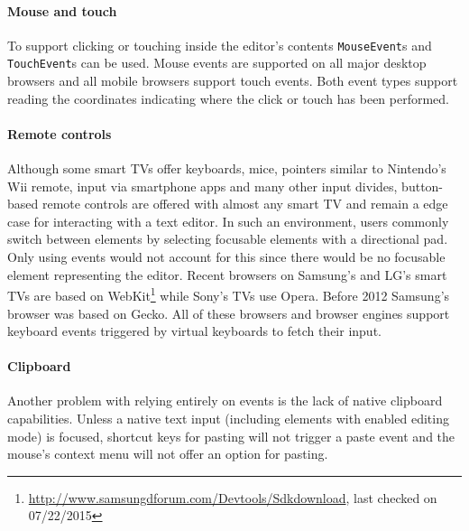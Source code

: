 \paragraph{Mouse and touch} To support clicking or touching inside the editor's contents \texttt{MouseEvent}s and \texttt{TouchEvent}s can be used. Mouse events are supported on all major desktop browsers and all mobile browsers support touch events. Both event types support reading the coordinates indicating where the click or touch has been performed.

\paragraph{Remote controls} Although some smart TVs offer keyboards, mice, pointers similar to Nintendo's Wii remote, input via smartphone apps and many other input divides, button-based remote controls are offered with almost any smart TV and remain a edge case for interacting with a text editor. In such an environment, users commonly switch between elements by selecting focusable elements with a directional pad. Only using events would not account for this since there would be no focusable element representing the editor. Recent browsers on Samsung's and LG's smart TVs are based on WebKit\footnote{\url{http://www.samsungdforum.com/Devtools/Sdkdownload}, last checked on 07/22/2015} while Sony's TVs use Opera. Before 2012 Samsung's browser was based on Gecko. All of these browsers and browser engines support keyboard events triggered by virtual keyboards to fetch their input.

\paragraph{Clipboard} Another problem with relying entirely on events is the lack of native clipboard capabilities. Unless a native text input (including elements with enabled editing mode) is focused, shortcut keys for pasting will not trigger a paste event and the mouse's context menu will not offer an option for pasting. %

